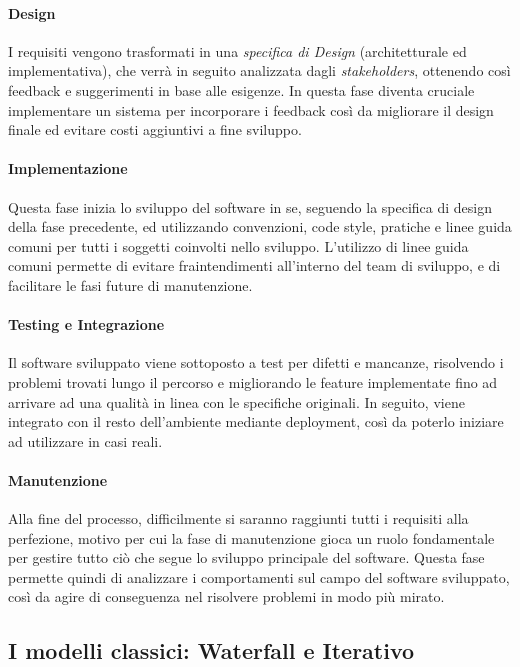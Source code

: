 \documentclass[a4paper,12pt]{report}
\begin{document}
				\paragraph{Design}
				I requisiti vengono trasformati in una \emph{specifica di Design} (architetturale ed implementativa), che verrà in seguito analizzata dagli \emph{stakeholders}, ottenendo così feedback e suggerimenti in base alle esigenze. In questa fase diventa cruciale implementare un sistema per incorporare i feedback così da migliorare il design finale ed evitare costi aggiuntivi a fine sviluppo.
				
				\paragraph{Implementazione}
				Questa fase inizia lo sviluppo del software in se, seguendo la specifica di design della fase precedente, ed utilizzando convenzioni, code style, pratiche e linee guida comuni per tutti i soggetti coinvolti nello sviluppo. L'utilizzo di linee guida comuni permette di evitare fraintendimenti all'interno del team di sviluppo, e di facilitare le fasi future di manutenzione.
				
				\paragraph{Testing e Integrazione}
				Il software sviluppato viene sottoposto a test per difetti e mancanze, risolvendo i problemi trovati lungo il percorso e migliorando le feature implementate fino ad arrivare ad una qualità in linea con le specifiche originali. In seguito, viene integrato con il resto dell'ambiente mediante deployment, così da poterlo iniziare ad utilizzare in casi reali.
				
				\paragraph{Manutenzione}
				Alla fine del processo, difficilmente si saranno raggiunti tutti i requisiti alla perfezione, motivo per cui la fase di manutenzione gioca un ruolo fondamentale per gestire tutto ciò che segue lo sviluppo principale del software. Questa fase permette quindi di analizzare i comportamenti sul campo del software sviluppato, così da agire di conseguenza nel risolvere problemi in modo più mirato.
	
			\subsection{I modelli classici: Waterfall e Iterativo}
			
\end{document}

